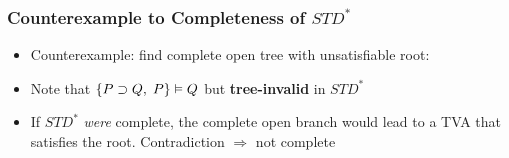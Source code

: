 \begin{frame}
\frametitle{Counterexample to Completeness of $STD^{\ast}$}

\begin{itemize}[<+->]


\item Counterexample: find \textcolor{OGlyallpink}{complete open tree} with \textcolor{highlightA}{unsatisfiable root}: 




\begin{center}
\end{center}


\item<3-> Note that $\{P\supset Q, \; P \} \vDash Q$ but \textbf{\textcolor{OGlyallpink}{tree-invalid}} in $STD^{\ast}$

\item<4-> \footnotesize{If $STD^{\ast}$ \textit{were} complete, the complete open branch would lead to a TVA that satisfies the root. Contradiction $\Rightarrow$ not complete} 

\end{itemize}







\end{frame}

